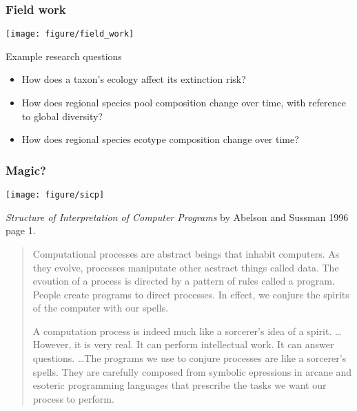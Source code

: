 \documentclass{beamer}
\begin{document}
\begin{frame}
  \frametitle{Field work}
  \texttt{[image: figure/field\_work]}
\end{frame}

\begin{frame}
  \begin{alertblock}{Example research questions}
    \begin{itemize}
      \item How does a taxon's ecology affect its extinction risk?
      \item How does regional species pool composition change over time, with reference to global diversity?
      \item How does regional species ecotype composition change over time?
    \end{itemize}
  \end{alertblock}
\end{frame}

\begin{frame}
  \frametitle{Magic?}
  \begin{center}
    \texttt{[image: figure/sicp]}
  \end{center}
\end{frame}


\begin{frame}
  \textit{Structure of Interpretation of Computer Programs} by Abelson and Sussman 1996 page 1.

  \begin{small}
    \begin{quotation}
      Computational processes are abstract beings that inhabit computers. As they evolve, processes maniputate other acstract things called data. The evoution of a process is directed by a pattern of rules called a program. People create programs to direct processes. In effect, we conjure the spirits of the computer with our spells.

      A computation process is indeed much like a sorcerer's idea of a spirit. \dots However, it is very real. It can perform intellectual work. It can answer questions. \dots The programs we use to conjure processes are like a sorcerer's spells. They are carefully composed from symbolic epressions in arcane and esoteric programming languages that prescribe the tasks we want our process to perform.
    \end{quotation}
  \end{small}
\end{frame}
\end{document}
